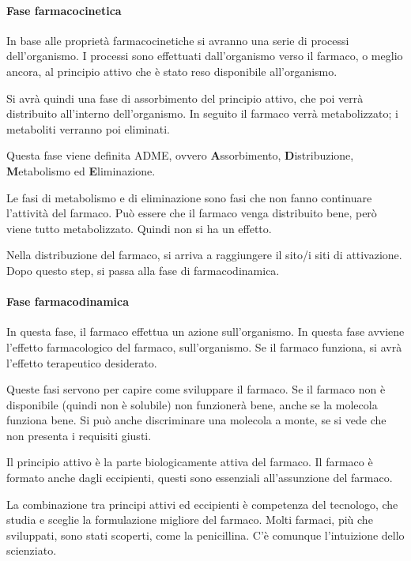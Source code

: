 \paragraph{Fase farmacocinetica}

In base alle proprietà farmacocinetiche si avranno una serie di processi
dell'organismo. I processi sono effettuati dall'organismo verso il
farmaco, o meglio ancora, al principio attivo che è stato reso
disponibile all'organismo.

Si avrà quindi una fase di assorbimento del principio attivo, che poi
verrà distribuito all'interno dell'organismo. In seguito il farmaco
verrà metabolizzato; i metaboliti verranno poi eliminati.

Questa fase viene definita ADME, ovvero \textbf{A}ssorbimento, \textbf{D}istribuzione,
\textbf{M}etabolismo ed \textbf{E}liminazione.

Le fasi di metabolismo e di eliminazione sono fasi che non fanno
continuare l'attività del farmaco.
Può essere che il farmaco venga distribuito bene, però viene tutto
metabolizzato. Quindi non si ha un effetto.

Nella distribuzione del farmaco, si arriva a raggiungere il sito/i siti
di attivazione. Dopo questo step, si passa alla fase di farmacodinamica.

\paragraph{Fase farmacodinamica}

In questa fase, il farmaco effettua un azione sull'organismo. In questa
fase avviene l'effetto farmacologico del farmaco, sull'organismo.
Se il farmaco funziona, si avrà l'effetto terapeutico desiderato.

Queste fasi servono per capire come sviluppare il farmaco. Se il farmaco
non è disponibile (quindi non è solubile) non funzionerà bene, anche se
la molecola funziona bene.
Si può anche discriminare una molecola a monte, se si vede che non
presenta i requisiti giusti.

Il principio attivo è la parte biologicamente attiva del farmaco. Il
farmaco è formato anche dagli eccipienti, questi sono essenziali
all'assunzione del farmaco.

La combinazione tra principi attivi ed eccipienti è competenza del
tecnologo, che studia e sceglie la formulazione migliore del farmaco.
Molti farmaci, più che sviluppati, sono stati scoperti, come la
penicillina. C'è comunque l'intuizione dello scienziato.

